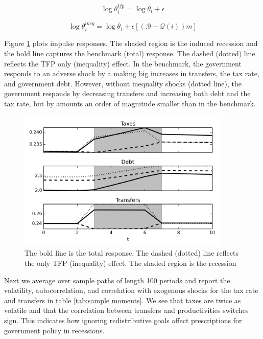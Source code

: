 \documentclass[thmsb,11pt]{article}
\begin{document}
\begin{equation*}
\log \theta^{tfp}_i=\log \overline{\theta}_i+\epsilon
\end{equation*}

\begin{equation*}
 \log \theta^{ineq}_i=\log \overline{\theta}_i+\epsilon [(.9-\mathcal{Q}(i))m]
\end{equation*}

Figure \ref{fig: irf} plots impulse responses. The shaded region is the induced recession and the bold line captures the benchmark (total) response. The dashed (dotted) line
reflects the TFP only  (inequality) effect.
In the benchmark, the government responds to an adverse shock by a making big increases in transfers, the  tax rate, and  government debt. However, without inequality shocks (dotted line), the government
responds by decreasing transfers and  increasing both debt and
the tax rate, but by  amounts an order of magnitude smaller than in the benchmark.
{
  \begin{figure}
    \centering
    \includegraphics[width = 0.9\textwidth]{cesplots/irf_bm_chi_shocks.png}
    \caption{The bold line is the total response. The dashed (dotted) line reflects the only TFP (inequality) effect. The shaded region is the recession}
    \label{fig: irf}
  \end{figure}

}
Next we average over sample paths of length 100 periods and report the volatility, autocorrelation, and correlation with exogenous shocks for the  tax rate
and transfers in table \ref{tab:sample moments}. We see that taxes are twice as volatile and that the correlation between transfers and productivities switches sign.
This  indicates how ignoring redistributive goals affect  prescriptions for government
policy in recessions.
\end{document}

